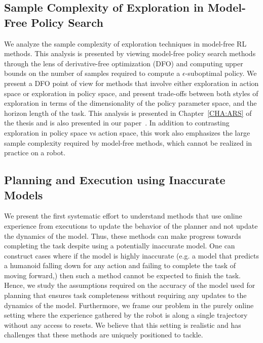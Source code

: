 \subsection{Sample Complexity of Exploration in Model-Free Policy
  Search}
\label{sec:sample-compl-expl}
We analyze the sample complexity of exploration techniques in
  model-free RL methods. This analysis is presented by viewing model-free policy
  search methods through the lens of derivative-free optimization (DFO)
  and computing upper bounds on the number of samples
  required to compute a $\epsilon$-suboptimal policy. We present a DFO
  point of view for methods that involve either exploration in action
  space or exploration in policy space, and present trade-offs between
  both styles of exploration in terms of the dimensionality of the
  policy parameter space, and the horizon length of the task. This
  analysis is presented in Chapter~\ref{CHA:ARS} of the
  thesis and is also presented in our paper~\cite{aistats19}. In addition
  to contrasting exploration in policy space vs action space, this
  work also emphasizes the large sample complexity required by
  model-free methods, which cannot be realized in practice on a robot.
  
\subsection{Planning and Execution using Inaccurate Models}
\label{sec:plann-exec-using}
  We present the first systematic effort to understand methods
  that use online experience from executions to update the behavior of
  the planner and not update the dynamics of the model. Thus, these
  methods can make progress towards completing the task despite using
  a potentially inaccurate model. One can construct cases where if the
  model is highly inaccurate (e.g. a model that predicts a humanoid
  falling down for any action and failing to complete the task of
  moving forward,) then such a method cannot be expected to finish the
  task. Hence, we study the assumptions required on the accuracy of
  the model used for planning that ensures task completeness without
  requiring any updates to the dynamics of the model. Furthermore, we
  frame our problem in the purely online setting where the experience
  gathered by the robot is along a single trajectory without any
  access to resets. We believe that this setting is realistic and has
  challenges that these methods are uniquely positioned to tackle.


